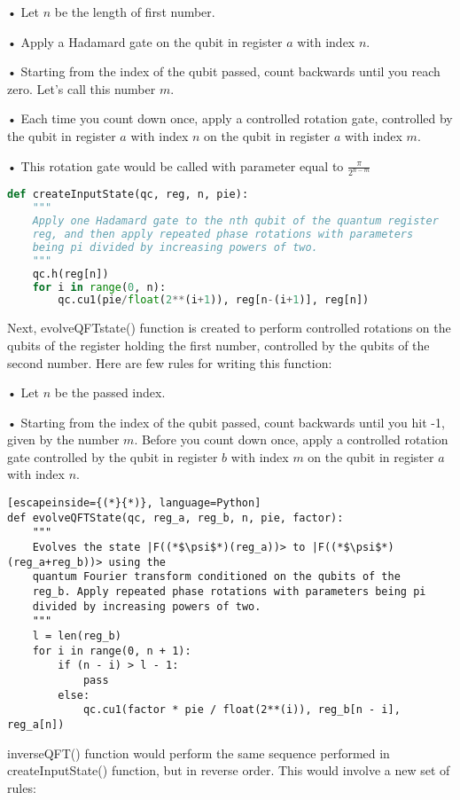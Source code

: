 \documentclass{cpp}
\begin{document}
•	Let $n$ be the length of first number.

•	Apply a Hadamard gate on the qubit in register $a$ with index $n$.

•	Starting from the index of the qubit passed, count backwards until you reach zero. Let’s call this number $m$.

•	Each time you count down once, apply a controlled rotation gate, controlled by the qubit in register $a$ with index $n$ on the qubit in register $a$ with index $m$.

•	This rotation gate would be called with parameter equal to $\frac{\pi}{2 ^ {n - m}}$

\begin{lstlisting}[language=Python]
def createInputState(qc, reg, n, pie):
    """
    Apply one Hadamard gate to the nth qubit of the quantum register               
    reg, and then apply repeated phase rotations with parameters  
    being pi divided by increasing powers of two.
    """
    qc.h(reg[n])    
    for i in range(0, n):
        qc.cu1(pie/float(2**(i+1)), reg[n-(i+1)], reg[n])
\end{lstlisting}

Next, evolveQFTstate() function is created to perform controlled rotations on the qubits of the register holding the first number, controlled by the qubits of the second number. Here are few rules for writing this function:

•	Let $n$ be the passed index.

•	Starting from the index of the qubit passed, count backwards until you hit -1, given by the number $m$. Before you count down once, apply a controlled rotation gate controlled by the qubit in register $b$ with index $m$ on the qubit in register $a$ with index $n$.

\begin{lstlisting}[escapeinside={(*}{*)}, language=Python]
def evolveQFTState(qc, reg_a, reg_b, n, pie, factor):
    """  
    Evolves the state |F((*$\psi$*)(reg_a))> to |F((*$\psi$*)(reg_a+reg_b))> using the   
    quantum Fourier transform conditioned on the qubits of the 
    reg_b. Apply repeated phase rotations with parameters being pi 
    divided by increasing powers of two.
    """
    l = len(reg_b)
    for i in range(0, n + 1):
        if (n - i) > l - 1:
            pass
        else:
            qc.cu1(factor * pie / float(2**(i)), reg_b[n - i], reg_a[n])
\end{lstlisting}

\newpage
inverseQFT() function would perform the same sequence performed in createInputState() function, but in reverse order. This would involve a new set of rules:
\end{document}
